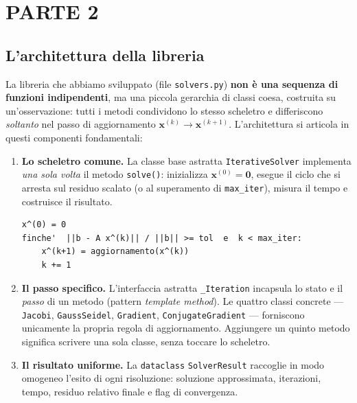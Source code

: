 \documentclass[11pt,a4paper]{article}
\begin{document}
\section{PARTE 2}

\subsection{L'architettura della libreria}
La libreria che abbiamo sviluppato (file \texttt{solvers.py}) \textbf{non è una
sequenza di funzioni indipendenti}, ma una piccola gerarchia di classi coesa,
costruita su un'osservazione: tutti i metodi condividono lo stesso scheletro e
differiscono \emph{soltanto} nel passo di aggiornamento
$\mathbf{x}^{(k)}\to\mathbf{x}^{(k+1)}$. L'architettura si articola in questi
componenti fondamentali:

\begin{enumerate}[leftmargin=1.8em]
  \item \textbf{Lo scheletro comune.} La classe base astratta
  \texttt{IterativeSolver} implementa \emph{una sola volta} il metodo
  \texttt{solve()}: inizializza $\mathbf{x}^{(0)}=\mathbf{0}$, esegue il ciclo che
  si arresta sul residuo scalato (o al superamento di \texttt{max\_iter}), misura
  il tempo e costruisce il risultato.
  \begin{lstlisting}
x^(0) = 0
finche'  ||b - A x^(k)|| / ||b|| >= tol  e  k < max_iter:
    x^(k+1) = aggiornamento(x^(k))
    k += 1
  \end{lstlisting}

  \item \textbf{Il passo specifico.} L'interfaccia astratta \texttt{\_Iteration}
  incapsula lo stato e il \emph{passo} di un metodo (pattern \emph{template
  method}). Le quattro classi concrete --- \texttt{Jacobi},
  \texttt{GaussSeidel}, \texttt{Gradient}, \texttt{ConjugateGradient} ---
  forniscono unicamente la propria regola di aggiornamento. Aggiungere un quinto
  metodo significa scrivere una sola classe, senza toccare lo scheletro.

  \item \textbf{Il risultato uniforme.} La \texttt{dataclass}
  \texttt{SolverResult} raccoglie in modo omogeneo l'esito di ogni risoluzione:
  soluzione approssimata, iterazioni, tempo, residuo relativo finale e flag di
  convergenza.
\end{enumerate}
\end{document}
